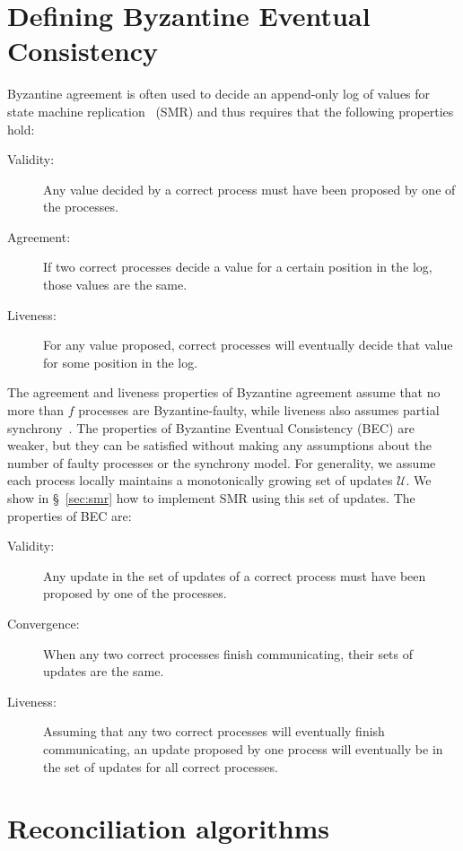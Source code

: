 \documentclass[a4paper,anonymous,USenglish]{lipics-v2019}
\begin{document}
\section{Defining Byzantine Eventual Consistency}\label{sec:properties}

Byzantine agreement is often used to decide an append-only log of values for state machine replication~\cite{Schneider:1990} (SMR) and thus requires that the following properties hold:

\begin{description}
\item[Validity:] Any value decided by a correct process must have been proposed by one of the processes.
\item[Agreement:] If two correct processes decide a value for a certain position in the log, those values are the same.
\item[Liveness:] For any value proposed, correct processes will eventually decide that value for some position in the log.
\end{description}

The agreement and liveness properties of Byzantine agreement assume that no more than $f$ processes are Byzantine-faulty, while liveness also assumes partial synchrony~\cite{Dwork:1988}.
The properties of Byzantine Eventual Consistency (BEC) are weaker, but they can be satisfied without making any assumptions about the number of faulty processes or the synchrony model.
For generality, we assume each process locally maintains a monotonically growing set of updates $\mathcal{U}$.
We show in \S~\ref{sec:smr} how to implement SMR using this set of updates.
The properties of BEC are:

\begin{description}
\item[Validity:] Any update in the set of updates of a correct process must have been proposed by one of the processes.
\item[Convergence:] When any two correct processes finish communicating, their sets of updates are the same.
\item[Liveness:] Assuming that any two correct processes will eventually finish communicating, an update proposed by one process will eventually be in the set of updates for all correct processes.
\end{description}

\section{Reconciliation algorithms}\label{sec:algorithm}
\end{document}
